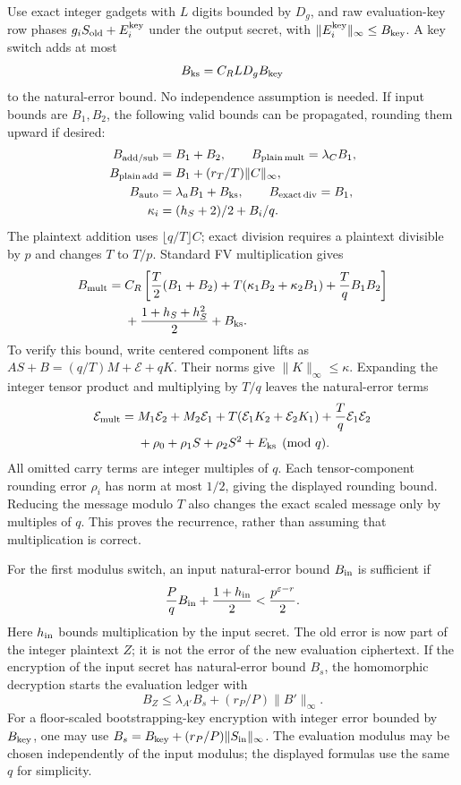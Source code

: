 Use exact integer gadgets with $L$ digits bounded by $D_g$, and raw evaluation-key row phases $g_iS_{\rm old}+E_i^{\rm key}$ under the output secret, with $\|E_i^{\rm key}\|_\infty\leq B_{\rm key}$. A key switch adds at most
\[
B_{\rm ks}=C_RLD_gB_{\rm key}
\]
to the natural-error bound. No independence assumption is needed. If input bounds are $B_1,B_2$, the following valid bounds can be propagated, rounding them upward if desired:
\[
\begin{aligned}
B_{\rm add/sub}&=B_1+B_2,\qquad B_{\rm plain\,mult}=\lambda_CB_1,\\
B_{\rm plain\,add}&=B_1+(r_T/T)\|C\|_\infty,\\
B_{\rm auto}&=\lambda_aB_1+B_{\rm ks},\qquad B_{\rm exact\,div}=B_1,\\
\kappa_i&=(h_S+2)/2+B_i/q.
\end{aligned}
\]
The plaintext addition uses $\lfloor q/T\rfloor C$; exact division requires a plaintext divisible by $p$ and changes $T$ to $T/p$. Standard FV multiplication gives
\[
\begin{aligned}
B_{\rm mult}={}&C_R\left[\frac T2(B_1+B_2)
+T(\kappa_1B_2+\kappa_2B_1)+\frac TqB_1B_2\right]\\
&+\frac{1+h_S+h_S^2}{2}+B_{\rm ks}.
\end{aligned}
\]
To verify this bound, write centered component lifts as $AS+B=(q/T)M+\mathcal E+qK$. Their norms give $\|K\|_\infty\leq\kappa$. Expanding the integer tensor product and multiplying by $T/q$ leaves the natural-error terms
\[
\begin{aligned}
\mathcal E_{\rm mult}={}&M_1\mathcal E_2+M_2\mathcal E_1
+T(\mathcal E_1K_2+\mathcal E_2K_1)+\frac Tq\mathcal E_1\mathcal E_2\\
&+\rho_0+\rho_1S+\rho_2S^2+E_{\rm ks}\pmod q.
\end{aligned}
\]
All omitted carry terms are integer multiples of $q$. Each tensor-component rounding error $\rho_i$ has norm at most $1/2$, giving the displayed rounding bound. Reducing the message modulo $T$ also changes the exact scaled message only by multiples of $q$. This proves the recurrence, rather than assuming that multiplication is correct.

For the first modulus switch, an input natural-error bound $B_{\rm in}$ is sufficient if
\[
\frac PqB_{\rm in}+\frac{1+h_{\rm in}}2
<\frac{p^{\varepsilon-r}}2.
\]
Here $h_{\rm in}$ bounds multiplication by the input secret. The old error is now part of the integer plaintext $Z$; it is not the error of the new evaluation ciphertext. If the encryption of the input secret has natural-error bound $B_s$, the homomorphic decryption starts the evaluation ledger with
\[
B_Z\leq\lambda_{A'}B_s+(r_P/P)\|B'\|_\infty.
\]
For a floor-scaled bootstrapping-key encryption with integer error bounded by $B_{\rm key}$, one may use $B_s=B_{\rm key}+(r_P/P)\|S_{\rm in}\|_\infty$. The evaluation modulus may be chosen independently of the input modulus; the displayed formulas use the same $q$ for simplicity.

